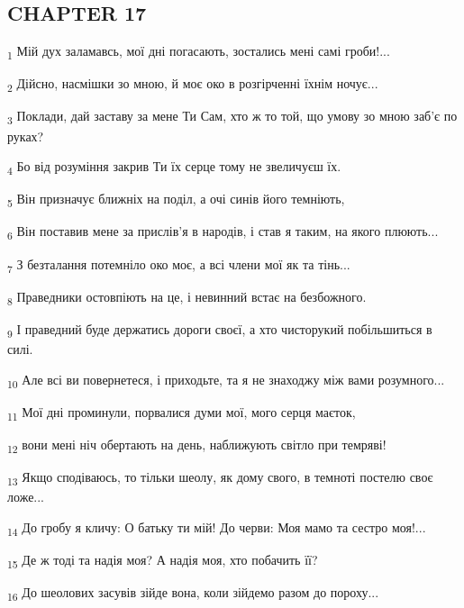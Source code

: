 \subsection{CHAPTER 17}
\begin{tcolorbox}
\textsubscript{1} Мій дух заламавсь, мої дні погасають, зостались мені самі гроби!...
\end{tcolorbox}
\begin{tcolorbox}
\textsubscript{2} Дійсно, насмішки зо мною, й моє око в розгірченні їхнім ночує...
\end{tcolorbox}
\begin{tcolorbox}
\textsubscript{3} Поклади, дай заставу за мене Ти Сам, хто ж то той, що умову зо мною заб'є по руках?
\end{tcolorbox}
\begin{tcolorbox}
\textsubscript{4} Бо від розуміння закрив Ти їх серце тому не звеличуєш їх.
\end{tcolorbox}
\begin{tcolorbox}
\textsubscript{5} Він призначує ближніх на поділ, а очі синів його темніють,
\end{tcolorbox}
\begin{tcolorbox}
\textsubscript{6} Він поставив мене за прислів'я в народів, і став я таким, на якого плюють...
\end{tcolorbox}
\begin{tcolorbox}
\textsubscript{7} З безталання потемніло око моє, а всі члени мої як та тінь...
\end{tcolorbox}
\begin{tcolorbox}
\textsubscript{8} Праведники остовпіють на це, і невинний встає на безбожного.
\end{tcolorbox}
\begin{tcolorbox}
\textsubscript{9} І праведний буде держатись дороги своєї, а хто чисторукий побільшиться в силі.
\end{tcolorbox}
\begin{tcolorbox}
\textsubscript{10} Але всі ви повернетеся, і приходьте, та я не знаходжу між вами розумного...
\end{tcolorbox}
\begin{tcolorbox}
\textsubscript{11} Мої дні проминули, порвалися думи мої, мого серця маєток,
\end{tcolorbox}
\begin{tcolorbox}
\textsubscript{12} вони мені ніч обертають на день, наближують світло при темряві!
\end{tcolorbox}
\begin{tcolorbox}
\textsubscript{13} Якщо сподіваюсь, то тільки шеолу, як дому свого, в темноті постелю своє ложе...
\end{tcolorbox}
\begin{tcolorbox}
\textsubscript{14} До гробу я кличу: О батьку ти мій! До черви: Моя мамо та сестро моя!...
\end{tcolorbox}
\begin{tcolorbox}
\textsubscript{15} Де ж тоді та надія моя? А надія моя, хто побачить її?
\end{tcolorbox}
\begin{tcolorbox}
\textsubscript{16} До шеолових засувів зійде вона, коли зійдемо разом до пороху...
\end{tcolorbox}
